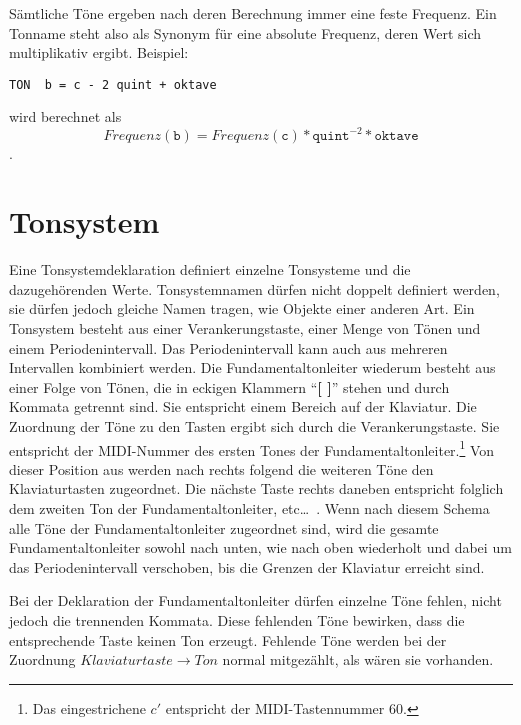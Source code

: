 Sämtliche Töne ergeben nach deren Berechnung immer eine feste Frequenz.
Ein Tonname steht also als Synonym für eine
absolute Frequenz, deren
Wert sich multiplikativ ergibt. Beispiel:
\begin{verbatim} 
TON  b = c - 2 quint + oktave 
\end{verbatim}
wird berechnet als \[Frequenz(\mathtt{b}) = Frequenz(\mathtt{c}) * \mathtt{quint}^{-2} * \mathtt{oktave}\].





\chapter{Tonsystem}\label{cha:tonsystem}
Eine Tonsystemdeklaration definiert einzelne Tonsysteme und die
dazugehörenden Werte. Tonsystemnamen dürfen nicht doppelt definiert
werden, sie dürfen jedoch gleiche Namen tragen,
wie Objekte einer anderen Art.
Ein Tonsystem besteht aus einer Verankerungstaste,
einer Menge von Tönen
und einem Periodenintervall.
Das Periodenintervall kann auch aus mehreren Intervallen
kombiniert werden.
Die Fundamentaltonleiter wiederum
besteht aus einer Folge von Tönen, die in eckigen Klammern
``\textbf{[ ]}''
 stehen und durch Kommata getrennt sind.
Sie entspricht einem Bereich auf der Klaviatur. Die Zuordnung der Töne
zu den Tasten ergibt sich durch die Verankerungstaste.
Sie entspricht der MIDI-Nummer des ersten Tones der
Fundamentaltonleiter.\footnote{Das eingestrichene $c'$ entspricht
der MIDI-Tastennummer 60.}
Von dieser Position aus werden nach rechts folgend die weiteren Töne
den Klaviaturtasten zugeordnet. Die nächste Taste rechts daneben entspricht
folglich dem zweiten Ton der Fundamentaltonleiter, etc\ldots\ .
Wenn nach diesem Schema
alle Töne der Fundamentaltonleiter zugeordnet sind, wird die gesamte
Fundamentaltonleiter sowohl nach unten, wie nach oben wiederholt und
dabei um das Periodenintervall\label{Periodenintervall}
verschoben, bis die Grenzen der Klaviatur erreicht sind.

Bei der Deklaration der Fundamentaltonleiter
dürfen einzelne Töne fehlen, nicht jedoch die trennenden Kommata.
Diese fehlenden Töne bewirken,
dass die entsprechende Taste keinen Ton erzeugt.
Fehlende Töne werden bei der Zuordnung
$Klaviaturtaste \rightarrow Ton$ normal
mitgezählt, als wären sie vorhanden.



